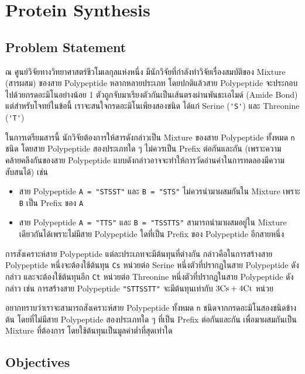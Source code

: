 \section{Protein Synthesis}

\subsection{Problem Statement}

ณ ศูนย์วิจัยทางวิทยาศาสตร์ชีวโมเลกุลแห่งหนึ่ง มีนักวิจัยที่กำลังทำวิจัยเรื่องสมบัติของ Mixture (สารผสม) ของสาย Polypeptide หลากหลายประเภท \;
โดยปกติแล้วสาย Polypeptide จะประกอบไปด้วยกรดอะมิโนอย่างน้อย 1 ตัวถูกจับมาเรียงตัวกันเป็นเส้นตรงผ่านพันธะเอไมด์ (Amide Bond) \;
แต่สำหรับโจทย์ในข้อนี้ เราจะสนใจกรดอะมิโนเพียงสองชนิด ได้แก่ Serine (\lstinline{'S'}) และ Threonine (\lstinline{'T'}) 

ในการเตรียมสารนี้ นักวิจัยต้องการให้สารดังกล่าวเป็น Mixture ของสาย Polypeptide ทั้งหมด \lstinline{n} ชนิด \;
โดยสาย Polypeptide สองประเภทใด ๆ ไม่ควรเป็น Prefix ต่อกันและกัน (เพราะความคล้ายคลึงกันของสาย Polypeptide แบบดังกล่าวอาจจะทำให้การวัดอ่านค่าในการทดลองมีความสับสนได้) เช่น

\begin{itemize}
\item  สาย Polypeptide \lstinline{A = "STSST"} และ \lstinline{B = "STS"} ไม่ควรนำมาผสมกันใน Mixture เพราะ \lstinline{B} เป็น Prefix ของ \lstinline{A}
\item  สาย Polypeptide \lstinline{A = "TTS"} และ \lstinline{B = "TSSTTS"} สามารถนำมาผสมอยู่ใน Mixture เดียวกันได้เพราะไม่มีสาย Polypeptide ใดที่เป็น Prefix ของ Polypeptide อีกสายหนึ่ง
\end{itemize}

การสังเคราะห์สาย Polypeptide แต่ละประเภทจะมีต้นทุนที่ต่างกัน \;
กล่าวคือในการสร้างสาย Polypeptide หนึ่งจะต้องใช้ต้นทุน \lstinline{Cs} หน่วยต่อ Serine หนึ่งตัวที่ปรากฏในสาย Polypeptide ดังกล่าว และจะต้องใช้ต้นทุนอีก \lstinline{Ct} หน่วยต่อ Threonine หนึ่งตัวที่ปรากฏในสาย Polypeptide ดังกล่าว \;
เช่น การสร้างสาย Polypeptide \lstinline{"STTSSTT"} จะมีต้นทุนเท่ากับ $3 \text{\lstinline{Cs}} + 4 \text{\lstinline{Ct}}$ หน่วย

อยากทราบว่าเราจะสามารถสังเคราะห์สาย Polypeptide ทั้งหมด \lstinline{n} ชนิดจากกรดอะมิโนสองชนิดข้างต้น โดยที่ไม่มีสาย Polypeptide สองประเภทใด ๆ ที่เป็น Prefix ต่อกันและกัน เพื่อมาผสมกันเป็น Mixture ที่ต้องการ โดยใช้ต้นทุนเป็นมูลค่าต่ำที่สุดเท่าใด


\subsection{Objectives}

